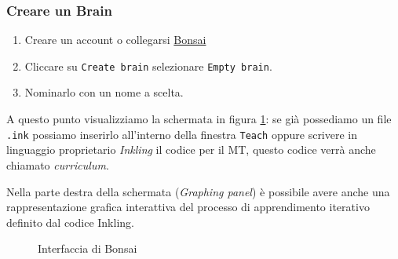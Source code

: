 \subsubsection{Creare un Brain}
\begin{enumerate}
\item  Creare un account o collegarsi \href{https://preview.bons.ai/accounts/signin}{Bonsai}
\item  Cliccare su \texttt{Create brain} selezionare \texttt{Empty brain}.
\item  Nominarlo con un nome a scelta.
\end{enumerate}
A questo punto visualizziamo la schermata in figura \ref{fig:window}: se già possediamo un file \texttt{.ink} possiamo inserirlo all'interno della finestra \texttt{Teach} oppure scrivere in linguaggio proprietario \textit{Inkling} il codice per il MT, questo codice verrà anche chiamato \textit{curriculum}. 

Nella parte destra della schermata (\textit{Graphing panel}) è possibile avere anche una rappresentazione grafica interattiva del processo di apprendimento iterativo definito dal codice Inkling.


\begin{figure}[!h]
    \centering
    \caption{Interfaccia di Bonsai}
    \label{fig:window}
\end{figure}

